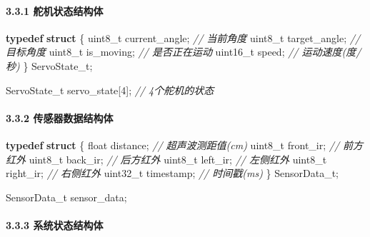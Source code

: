 \documentclass[
]{article}
\newenvironment{Shaded}{}{}
\newcommand{\CommentTok}[1]{\textcolor[rgb]{0.38,0.63,0.69}{\textit{#1}}}
\newcommand{\DataTypeTok}[1]{\textcolor[rgb]{0.56,0.13,0.00}{#1}}
\newcommand{\DecValTok}[1]{\textcolor[rgb]{0.25,0.63,0.44}{#1}}
\newcommand{\KeywordTok}[1]{\textcolor[rgb]{0.00,0.44,0.13}{\textbf{#1}}}
\newcommand{\NormalTok}[1]{#1}
\begin{document}
\hypertarget{ux8235ux673aux72b6ux6001ux7ed3ux6784ux4f53}{%
\paragraph{3.3.1
舵机状态结构体}\label{ux8235ux673aux72b6ux6001ux7ed3ux6784ux4f53}}

\begin{Shaded}
\begin{Highlighting}[]
\KeywordTok{typedef} \KeywordTok{struct}\NormalTok{ \{}
    \DataTypeTok{uint8\_t}\NormalTok{ current\_angle;   }\CommentTok{// 当前角度}
    \DataTypeTok{uint8\_t}\NormalTok{ target\_angle;    }\CommentTok{// 目标角度}
    \DataTypeTok{uint8\_t}\NormalTok{ is\_moving;       }\CommentTok{// 是否正在运动}
    \DataTypeTok{uint16\_t}\NormalTok{ speed;          }\CommentTok{// 运动速度(度/秒)}
\NormalTok{\} ServoState\_t;}

\NormalTok{ServoState\_t servo\_state[}\DecValTok{4}\NormalTok{];  }\CommentTok{// 4个舵机的状态}
\end{Highlighting}
\end{Shaded}

\hypertarget{ux4f20ux611fux5668ux6570ux636eux7ed3ux6784ux4f53}{%
\paragraph{3.3.2
传感器数据结构体}\label{ux4f20ux611fux5668ux6570ux636eux7ed3ux6784ux4f53}}

\begin{Shaded}
\begin{Highlighting}[]
\KeywordTok{typedef} \KeywordTok{struct}\NormalTok{ \{}
    \DataTypeTok{float}\NormalTok{ distance;          }\CommentTok{// 超声波测距值(cm)}
    \DataTypeTok{uint8\_t}\NormalTok{ front\_ir;        }\CommentTok{// 前方红外}
    \DataTypeTok{uint8\_t}\NormalTok{ back\_ir;         }\CommentTok{// 后方红外}
    \DataTypeTok{uint8\_t}\NormalTok{ left\_ir;         }\CommentTok{// 左侧红外}
    \DataTypeTok{uint8\_t}\NormalTok{ right\_ir;        }\CommentTok{// 右侧红外}
    \DataTypeTok{uint32\_t}\NormalTok{ timestamp;      }\CommentTok{// 时间戳(ms)}
\NormalTok{\} SensorData\_t;}

\NormalTok{SensorData\_t sensor\_data;}
\end{Highlighting}
\end{Shaded}

\hypertarget{ux7cfbux7edfux72b6ux6001ux7ed3ux6784ux4f53}{%
\paragraph{3.3.3
系统状态结构体}\label{ux7cfbux7edfux72b6ux6001ux7ed3ux6784ux4f53}}
\end{document}
